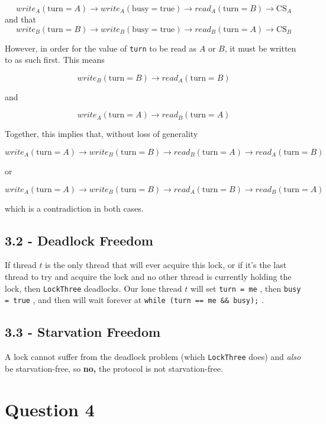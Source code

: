\documentclass[11pt, letterpaper]{article}
\newcommand{\code}[1] { \texttt{#1} }
\begin{document}
$$
write_A(\text{turn} = A) \rightarrow write_A(\text{busy} = \text{true}) \rightarrow
read_A(\text{turn} = B) \rightarrow \text{CS}_A
$$
and that
$$
write_B(\text{turn} = B) \rightarrow write_B(\text{busy} = \text{true}) \rightarrow
read_B(\text{turn} = A) \rightarrow \text{CS}_B
$$

However, in order for the value of \code{turn} to be read as $A$ or $B$, it must be written to as such first. This means

$$
write_B(\text{turn} = B) \rightarrow read_A(\text{turn} = B)
$$

and

$$
write_A(\text{turn} = A) \rightarrow read_B(\text{turn} = A)
$$

Together, this implies that, without loss of generality

$$
write_A(\text{turn} = A) \rightarrow write_B(\text{turn} = B) \rightarrow
read_B(\text{turn} = A) \rightarrow read_A(\text{turn} = B)
$$

or

$$
write_A(\text{turn} = A) \rightarrow write_B(\text{turn} = B) \rightarrow
read_A(\text{turn} = B) \rightarrow read_B(\text{turn} = A)
$$

which is a contradiction in both cases.

\subsection*{3.2 - Deadlock Freedom}
\label{sub:3_2_deadlock_freedom}

If thread $t$ is the only thread that will ever acquire this lock, or if it's the last thread to try and acquire the lock and no other thread is currently holding the lock, then \code{LockThree} deadlocks. Our lone thread $t$ will set \code{turn = me}, then \code{busy = true}, and then will wait forever at \code{while (turn == me && busy);}.

\subsection*{3.3 - Starvation Freedom}
\label{sub:3_3_starvation_freedom}

A lock cannot suffer from the deadlock problem (which \code{LockThree} does) and \textit{also} be starvation-free, so \textbf{no,} the protocol is not starvation-free.

\newpage
\section*{Question 4}
\label{sec:question_4}
\end{document}
